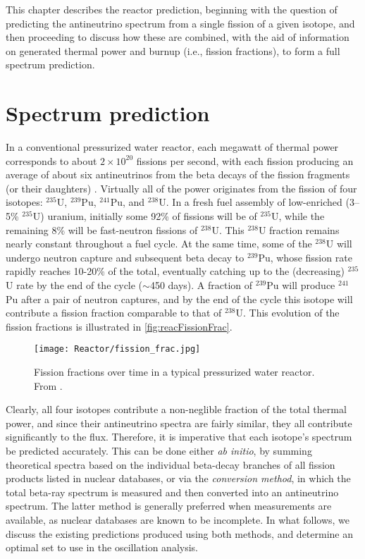 \documentclass[../thesis.tex]{subfiles}
\begin{document}
This chapter describes the reactor prediction, beginning with the question of predicting the antineutrino spectrum from a single fission of a given isotope, and then proceeding to discuss how these are combined, with the aid of information on generated thermal power and burnup (i.e., fission fractions), to form a full spectrum prediction.

\section{Spectrum prediction}
\label{sec:specpred}

\def\urfive{$^{235}$U\xspace} \def\punine{$^{239}$Pu\xspace}
\def\puone{$^{241}$Pu\xspace} \def\ureight{$^{238}$U\xspace}

In a conventional pressurized water reactor, each megawatt of thermal power corresponds to about $2\times10^{20}$ fissions per second, with each fission producing an average of about six antineutrinos from the beta decays of the fission fragments (or their daughters) \cite{PhysRevC.84.024617}. Virtually all of the power originates from the fission of four isotopes: \urfive, \punine, \puone, and \ureight. In a fresh fuel assembly of low-enriched (3--5\% $^{235}$U) uranium, initially some 92\% of fissions will be of \urfive, while the remaining 8\% will be fast-neutron fissions of \ureight. This \ureight fraction remains nearly constant throughout a fuel cycle. At the same time, some of the \ureight will undergo neutron capture and subsequent beta decay to \punine, whose fission rate rapidly reaches 10-20\% of the total, eventually catching up to the (decreasing) \urfive rate by the end of the cycle ($\sim$450 days). A fraction of \punine will produce \puone after a pair of neutron captures, and by the end of the cycle this isotope will contribute a fission fraction comparable to that of \ureight. This evolution of the fission fractions is illustrated in \autoref{fig:reacFissionFrac}.

\begin{figure}[ht]
  \texttt{[image: Reactor/fission\_frac.jpg]}
  \caption{Fission fractions over time in a typical pressurized water reactor. From \cite{spectrum2017}.}
  \label{fig:reacFissionFrac}
\end{figure}

Clearly, all four isotopes contribute a non-neglible fraction of the total thermal power, and since their antineutrino spectra are fairly similar, they all contribute significantly to the flux. Therefore, it is imperative that each isotope's spectrum be predicted accurately. This can be done either \emph{ab initio}, by summing theoretical spectra based on the individual beta-decay branches of all fission products listed in nuclear databases, or via the \emph{conversion method}, in which the total beta-ray spectrum is measured and then converted into an antineutrino spectrum. The latter method is generally preferred when measurements are available, as nuclear databases are known to be incomplete. In what follows, we discuss the existing predictions produced using both methods, and determine an optimal set to use in the oscillation analysis.
\end{document}
